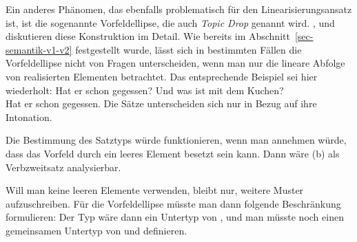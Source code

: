 Ein anderes Phänomen, das ebenfalls problematisch für den Linearisierungsansatz ist,
ist die sogenannte Vorfeldellipse, die auch \emph{Topic Drop} genannt
wird. \citet{Huang84},
\citet{Fries88b} und \citet{Hoffmann97a} diskutieren diese Konstruktion im Detail.
Wie bereits im Abschnitt~\ref{sec-semantik-v1-v2} festgestellt wurde, lässt sich in bestimmten
Fällen die Vorfeldellipse nicht von Fragen unterscheiden, wenn man nur die lineare Abfolge
von realisierten Elementen betrachtet. Das entsprechende Beispiel sei hier wiederholt:
\eal
\label{bsp-hat-er-gegessen-zwei}
\ex Hat er schon gegessen?
\ex Und was ist mit dem Kuchen?\\
    Hat er schon gegessen.
\zl
Die Sätze unterscheiden sich nur in Bezug auf ihre Intonation.

Die Bestimmung des Satztyps würde funktionieren, wenn man annehmen würde, dass das Vorfeld
durch ein leeres Element besetzt sein kann. Dann wäre (b) als Verbzweitsatz analysierbar.

Will man keine leeren Elemente verwenden, bleibt nur, weitere Muster aufzuschreiben. Für die Vorfeldellipse
müsste man dann \zb folgende Beschränkung formulieren:
\ea
{} \impl {}
\z
Der Typ  wäre dann ein Untertyp von , und man müsste
noch einen gemeinsamen Untertyp von  und  definieren.


